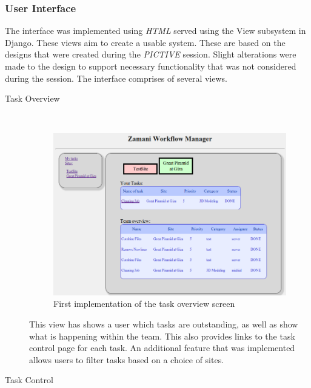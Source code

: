 \documentclass[12pt,a4paper]{report}
\begin{document}
\subsubsection{User Interface}
The interface was implemented using \emph{HTML} served using the View subsystem in Django.
These views aim to create a usable system. These are based on the designs that were created
during the \emph{PICTIVE} session. Slight alterations were made to the design to support 
necessary functionality that was not considered during the session. The interface comprises of several
views.
\begin{description}
\item[Task Overview] \hfill \\
    \begin{figure}[!h]
        \begin{center}
            \includegraphics[scale=0.4]{figures/task_overview_impl2.png}
        \end{center}
        \caption{First implementation of the task overview screen}
        \label{task_overview_impl2}
    \end{figure}
    This view has shows a user which tasks are outstanding, as well as show what is
    happening within the team. This also provides links to the task control page for each task.
    An additional feature that was implemented allows users to filter tasks based on a choice
    of sites.
\item[Task Control] \hfill \\
    \begin{figure}[!h]
        \begin{center}

\end{center}
\end{figure}
\end{description}
\end{document}
